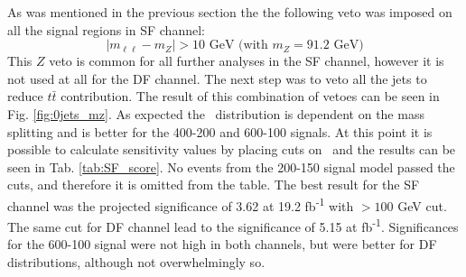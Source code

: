 As was mentioned in the previous section the the following veto was imposed on all the signal regions in SF channel:
\begin{equation*}
|m_{\ell \ell} - m_Z| > 10 \text{ GeV (with } m_Z = 91.2 \text{ GeV}) 
\end{equation*}
This $Z$ veto is common for all further analyses in the SF channel, however it is not used at all for the DF channel.
The next step was to veto all the jets to reduce $t\bar{t}$ contribution. The result of this combination of vetoes can be seen in Fig. \ref{fig:0jets_mz}. As expected the \mttwo \, distribution is dependent on the mass splitting and is better for the 400-200 and 600-100 signals. At this point it is possible to calculate sensitivity values by placing cuts on \mttwo \, and the results can be seen in Tab. \ref{tab:SF_score}. No events from the 200-150 signal model passed the cuts, and therefore it is omitted from the table. The best result for the SF channel was the projected significance of 3.62 at 19.2 fb\textsuperscript{-1}  with \mttwo$>100$ GeV cut. The same cut for DF channel lead to the significance of 5.15  at  fb\textsuperscript{-1}. Significances for the 600-100 signal were not high in both channels, but were better for DF distributions, although not overwhelmingly so. 


